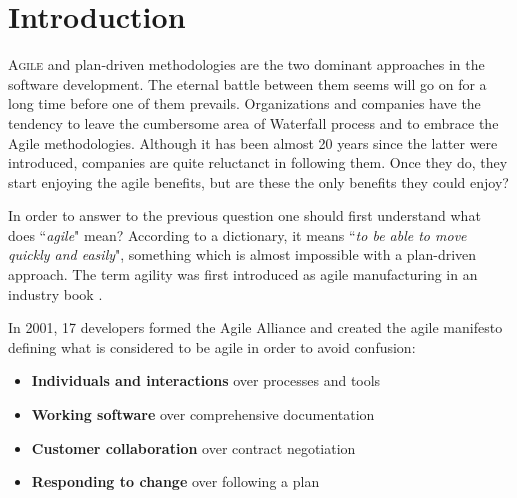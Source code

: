 \chapter{Introduction}
\label{ch:introduction}

\lettrine[lines=4, loversize=-0.1, lraise=0.1]{A}{gile} and plan-driven methodologies are the two dominant approaches in the software development. The eternal battle between them seems will go on for a long time before  one of them prevails. Organizations and companies have the tendency to leave the cumbersome area of Waterfall process and to embrace the Agile methodologies. Although it has been almost 20 years since the latter were introduced, companies are quite reluctanct in following them. Once they do, they start enjoying the agile benefits, but are these the only benefits they could enjoy? 

In order to answer to the previous question one should first understand what does ``\textit{agile}" mean? According to a dictionary, it means ``\textit{to be able to move quickly and easily}", something which is almost impossible with a plan-driven approach. The term agility was first introduced as agile manufacturing in an industry book \cite{agile_manufacturing}.

In 2001, 17 developers formed the Agile Alliance and created the agile manifesto \cite{beck2001agile} defining what is considered to be agile in order to avoid confusion:  
\begin{itemize}
	\item {\large \textbf{Individuals and interactions}} over processes and tools
	\item {\large \textbf{Working software}} over comprehensive documentation
	\item {\large \textbf{Customer collaboration}} over contract negotiation
	\item {\large \textbf{Responding to change}} over following a plan
\end{itemize}

